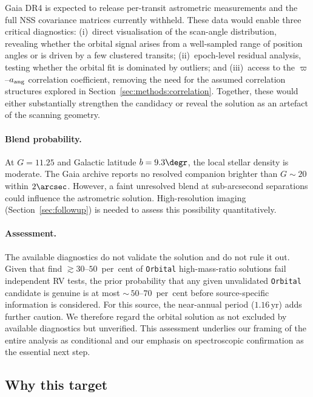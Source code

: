 \documentclass[usenatbib,fleqn]{mnras}
\begin{document}
Gaia DR4 is expected to release per-transit astrometric
measurements and the full NSS covariance matrices currently
withheld.  These data would enable three critical diagnostics:
(i)~direct visualisation of the scan-angle distribution, revealing
whether the orbital signal arises from a well-sampled range of
position angles or is driven by a few clustered transits;
(ii)~epoch-level residual analysis, testing whether the orbital
fit is dominated by outliers; and (iii)~access to the
$\varpi$--$a_{\rm ang}$ correlation coefficient, removing the
need for the assumed correlation structures explored in
Section~\ref{sec:methods:correlation}.  Together, these would
either substantially strengthen the candidacy or reveal the
solution as an artefact of the scanning geometry.

\paragraph*{Blend probability.}
At $G = 11.25$ and Galactic latitude $b = 9.3\degr$, the local
stellar density is moderate.  The Gaia archive reports no resolved
companion brighter than $G \sim 20$ within $2\arcsec$.  However,
a faint unresolved blend at sub-arcsecond separations could
influence the astrometric solution.  High-resolution imaging
(Section~\ref{sec:followup}) is needed to assess this possibility
quantitatively.

\paragraph*{Assessment.}
The available diagnostics do not validate the solution and do not
rule it out.
Given that \citet{ElBadry2024} find $\gtrsim 30$--$50$~per~cent
of \texttt{Orbital} high-mass-ratio solutions fail independent RV
tests, the prior probability that any given unvalidated
\texttt{Orbital} candidate is genuine is at most
$\sim$\,$50$--$70$~per~cent before source-specific information is
considered.  For this source, the near-annual period
($1.16$\,yr) adds further caution.  We therefore regard the
orbital solution as not excluded by available diagnostics but
unverified.  This assessment underlies our framing of the entire
analysis as conditional and our emphasis on spectroscopic
confirmation as the essential next step.

\subsection{Why this target}
\label{sec:why_target}
\end{document}
